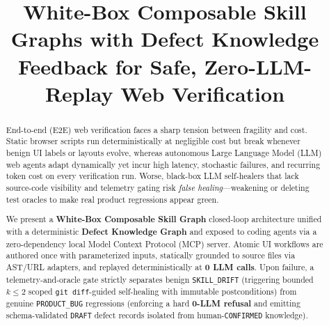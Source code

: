 \documentclass[conference]{IEEEtran}
\begin{document}
\title{White-Box Composable Skill Graphs with Defect Knowledge Feedback for Safe, Zero-LLM-Replay Web Verification}

\author{
}

\maketitle

\begin{abstract}
End-to-end (E2E) web verification faces a sharp tension between fragility and cost. Static browser scripts run deterministically at negligible cost but break whenever benign UI labels or layouts evolve, whereas autonomous Large Language Model (LLM) web agents adapt dynamically yet incur high latency, stochastic failures, and recurring token cost on every verification run. Worse, black-box LLM self-healers that lack source-code visibility and telemetry gating risk \emph{false healing}---weakening or deleting test oracles to make real product regressions appear green.

We present a \textbf{White-Box Composable Skill Graph} closed-loop architecture unified with a deterministic \textbf{Defect Knowledge Graph} and exposed to coding agents via a zero-dependency local Model Context Protocol (MCP) server. Atomic UI workflows are authored once with parameterized inputs, statically grounded to source files via AST/URL adapters, and replayed deterministically at \textbf{0 LLM calls}. Upon failure, a telemetry-and-oracle gate strictly separates benign \texttt{SKILL\_DRIFT} (triggering bounded $k \le 2$ scoped \texttt{git diff}-guided self-healing with immutable postconditions) from genuine \texttt{PRODUCT\_BUG} regressions (enforcing a hard \textbf{0-LLM refusal} and emitting schema-validated \texttt{DRAFT} defect records isolated from human-\texttt{CONFIRMED} knowledge).


\end{abstract}
\end{document}
